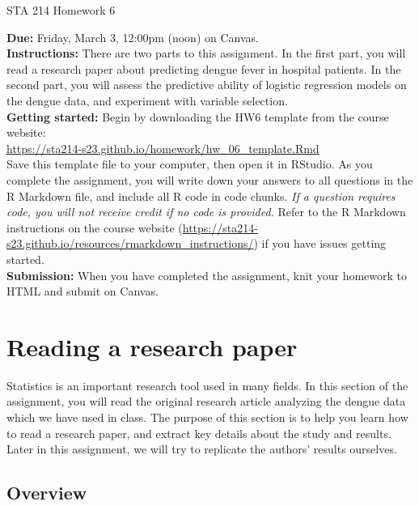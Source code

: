 \documentclass[11pt]{article}
\begin{document}
\begin{center}
\Large
STA 214 Homework 6\\
\normalsize
\vspace{5mm}
\end{center}

\noindent \textbf{Due:} Friday, March 3, 12:00pm (noon) on Canvas.\\ 

\noindent \textbf{Instructions:} There are two parts to this assignment. In the first part, you will read a research paper about predicting dengue fever in hospital patients. In the second part, you will assess the predictive ability of logistic regression models on the dengue data, and experiment with variable selection.\\

\noindent \textbf{Getting started:} Begin by downloading the HW6 template from the course website:\\

\url{https://sta214-s23.github.io/homework/hw_06_template.Rmd}\\

\noindent Save this template file to your computer, then open it in RStudio. As you complete the assignment, you will write down your answers to all questions in the R Markdown file, and include all R code in code chunks. \textit{If a question requires code, you will not receive credit if no code is provided.} Refer to the R Markdown instructions on the course website (\url{https://sta214-s23.github.io/resources/rmarkdown_instructions/}) if you have issues getting started.\\

\noindent \textbf{Submission:} When you have completed the assignment, knit your homework to HTML and submit on Canvas. 

\section{Reading a research paper}

Statistics is an important research tool used in many fields. In this section of the assignment, you will read the original research article analyzing the dengue data which we have used in class. The purpose of this section is to help you learn how to read a research paper, and extract key details about the study and results. Later in this assignment, we will try to replicate the authors' results ourselves.

\subsection*{Overview}
\end{document}
